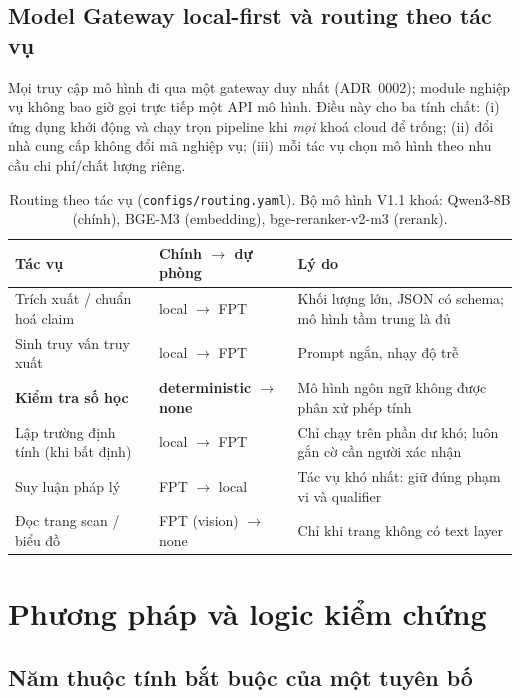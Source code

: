 \documentclass[11pt,a4paper]{article}
\newcommand{\code}[1]{\texttt{#1}}
\begin{document}
\subsection{Model Gateway local-first và routing theo tác vụ}

Mọi truy cập mô hình đi qua một gateway duy nhất (ADR~0002); module nghiệp vụ không bao giờ gọi trực tiếp một API mô hình. Điều này cho ba tính chất: (i) ứng dụng khởi động và chạy trọn pipeline khi \emph{mọi} khoá cloud để trống; (ii) đổi nhà cung cấp không đổi mã nghiệp vụ; (iii) mỗi tác vụ chọn mô hình theo nhu cầu chi phí/chất lượng riêng.

\begin{table}[!htbp]\small
\begin{tabularx}{\linewidth}{L{4.2cm} L{2.4cm} X}
\toprule
\textbf{Tác vụ} & \textbf{Chính $\to$ dự phòng} & \textbf{Lý do} \\
\midrule
Trích xuất / chuẩn hoá claim & local $\to$ FPT & Khối lượng lớn, JSON có schema; mô hình tầm trung là đủ \\
Sinh truy vấn truy xuất & local $\to$ FPT & Prompt ngắn, nhạy độ trễ \\
\textbf{Kiểm tra số học} & \textbf{deterministic $\to$ none} & Mô hình ngôn ngữ không được phân xử phép tính \\
Lập trường định tính (khi bất định) & local $\to$ FPT & Chỉ chạy trên phần dư khó; luôn gắn cờ cần người xác nhận \\
Suy luận pháp lý & FPT $\to$ local & Tác vụ khó nhất: giữ đúng phạm vi và qualifier \\
Đọc trang scan / biểu đồ & FPT (vision) $\to$ none & Chỉ khi trang không có text layer \\
\bottomrule
\end{tabularx}
\caption{Routing theo tác vụ (\code{configs/routing.yaml}). Bộ mô hình V1.1 khoá: Qwen3-8B (chính), BGE-M3 (embedding), bge-reranker-v2-m3 (rerank).}
\end{table}

\section{Phương pháp và logic kiểm chứng}

\subsection{Năm thuộc tính bắt buộc của một tuyên bố}
\end{document}
